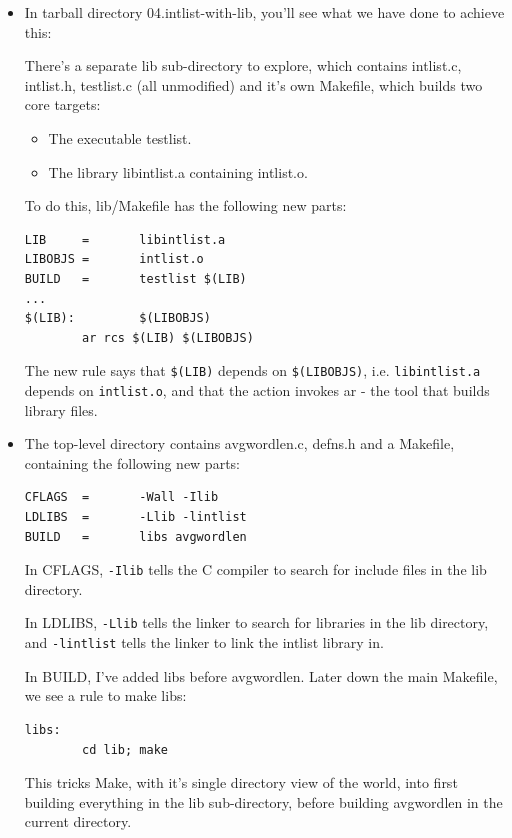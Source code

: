 \documentclass[aspectratio=169]{beamer}
\begin{document}
\begin{frame}[fragile]
\begin{itemize}
  \item
  In tarball directory \alert{04.intlist-with-lib}, you'll see
  what we have done to achieve this:

  \pitem
  There's a separate \alert{lib} sub-directory to explore, which contains \alert{intlist.c, intlist.h, testlist.c} (all unmodified) and it's own Makefile,
  which builds two core targets:
  \begin{itemize}
    \item
    The executable \alert{testlist}.
    \item
    The library \alert{libintlist.a} containing \alert{intlist.o}.
  \end{itemize}
  \pitem
  To do this, \alert{lib/Makefile} has the following new parts:
\begin{verbatim}
LIB     =       libintlist.a
LIBOBJS =       intlist.o
BUILD   =       testlist $(LIB)
...
$(LIB):         $(LIBOBJS)
        ar rcs $(LIB) $(LIBOBJS)
\end{verbatim}


\pitem
The new rule says that \verb+$(LIB)+ depends on \verb+$(LIBOBJS)+,
i.e. \verb+libintlist.a+ depends on \verb+intlist.o+, and that the action invokes 
\alert{ar} - the tool that builds library files.

\end{itemize}
\end{frame}

\begin{frame}[fragile]
\begin{itemize}
\item
The top-level directory contains \alert{avgwordlen.c}, \alert{defns.h} and a Makefile,
\pause
containing the following new parts:
\begin{verbatim}
CFLAGS  =       -Wall -Ilib
LDLIBS  =       -Llib -lintlist
BUILD   =       libs avgwordlen
\end{verbatim}

\pitem
In CFLAGS, \verb+-Ilib+ tells the C compiler to search for include files in
the lib directory.

\pitem
In LDLIBS, \verb+-Llib+ tells the linker to search for libraries in the lib directory, and \verb+-lintlist+ tells the linker
to link the intlist library in.

\pitem
In BUILD, I've added \alert{libs} before \alert{avgwordlen}.
Later down the main Makefile, we see a rule to make \alert{libs}:
\begin{verbatim}
libs:
        cd lib; make
\end{verbatim}

\pitem
This tricks Make, with it's \alert{single directory} view of the world,
into first building everything in the lib sub-directory,
before building \alert{avgwordlen} in the current directory.

\end{itemize}
\end{frame}
\end{document}
